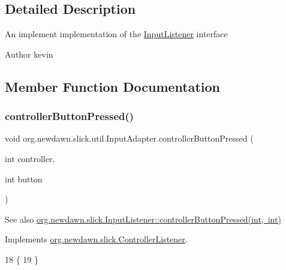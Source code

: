 \subsection{Detailed Description}
An implement implementation of the \mbox{\hyperlink{interfaceorg_1_1newdawn_1_1slick_1_1_input_listener}{Input\+Listener}} interface

\begin{DoxyAuthor}{Author}
kevin 
\end{DoxyAuthor}


\subsection{Member Function Documentation}
\mbox{\label{classorg_1_1newdawn_1_1slick_1_1util_1_1_input_adapter_ad51a716fce13f062b7bef542c2d7641a}} 
\subsubsection{\texorpdfstring{controller\+Button\+Pressed()}{controllerButtonPressed()}}
{\footnotesize\ttfamily void org.\+newdawn.\+slick.\+util.\+Input\+Adapter.\+controller\+Button\+Pressed (\begin{DoxyParamCaption}\item[{int}]{controller,  }\item[{int}]{button }\end{DoxyParamCaption})\hspace{0.3cm}{\ttfamily [inline]}}

\begin{DoxySeeAlso}{See also}
\mbox{\hyperlink{interfaceorg_1_1newdawn_1_1slick_1_1_controller_listener_ae6feac165a8d0eded01f38de12f239ff}{org.\+newdawn.\+slick.\+Input\+Listener\+::controller\+Button\+Pressed(int, int)}} 
\end{DoxySeeAlso}


Implements \mbox{\hyperlink{interfaceorg_1_1newdawn_1_1slick_1_1_controller_listener_ae6feac165a8d0eded01f38de12f239ff}{org.\+newdawn.\+slick.\+Controller\+Listener}}.


\begin{DoxyCode}
18                                                                     \{
19     \}
\end{DoxyCode}
\mbox{\label{classorg_1_1newdawn_1_1slick_1_1util_1_1_input_adapter_ab67126cbafdf4803d88270e945553019}} 
